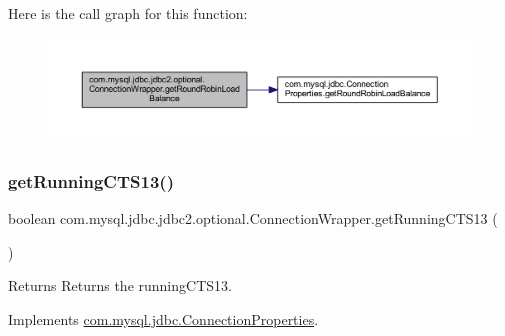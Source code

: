 Here is the call graph for this function\+:
\nopagebreak
\begin{figure}[H]
\begin{center}
\leavevmode
\includegraphics[width=350pt]{classcom_1_1mysql_1_1jdbc_1_1jdbc2_1_1optional_1_1_connection_wrapper_ac03ab6e1fcc1af0837d88f0db05b1407_cgraph}
\end{center}
\end{figure}
\mbox{\label{classcom_1_1mysql_1_1jdbc_1_1jdbc2_1_1optional_1_1_connection_wrapper_a36c11c49d3f4edb4131bef69c53e8141}} 
\subsubsection{\texorpdfstring{get\+Running\+C\+T\+S13()}{getRunningCTS13()}}
{\footnotesize\ttfamily boolean com.\+mysql.\+jdbc.\+jdbc2.\+optional.\+Connection\+Wrapper.\+get\+Running\+C\+T\+S13 (\begin{DoxyParamCaption}{ }\end{DoxyParamCaption})}

\begin{DoxyReturn}{Returns}
Returns the running\+C\+T\+S13. 
\end{DoxyReturn}


Implements \mbox{\hyperlink{interfacecom_1_1mysql_1_1jdbc_1_1_connection_properties_ac861d675728756c06dd2984057b95ab6}{com.\+mysql.\+jdbc.\+Connection\+Properties}}.

